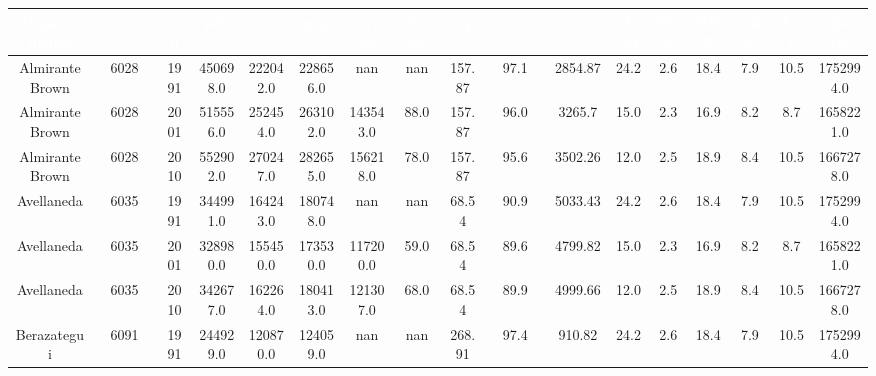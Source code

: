\begin{table}[htb]
\centering
\begin{tabular}{|c|c|c|c|c|c|c|c|c|c|c|c|c|c|c|c|c|}
\hline
\textbf{\cellcolor[rgb]{0,0.231,0.427}\textcolor{white}{Departamento}} & \textbf{\cellcolor[rgb]{0,0.231,0.427}\textcolor{white}{$cod_depto$}} & \textbf{\cellcolor[rgb]{0,0.231,0.427}\textcolor{white}{ano}} & \textbf{\cellcolor[rgb]{0,0.231,0.427}\textcolor{white}{pob}} & \textbf{\cellcolor[rgb]{0,0.231,0.427}\textcolor{white}{var}} & \textbf{\cellcolor[rgb]{0,0.231,0.427}\textcolor{white}{muj}} & \textbf{\cellcolor[rgb]{0,0.231,0.427}\textcolor{white}{vivpart}} & \textbf{\cellcolor[rgb]{0,0.231,0.427}\textcolor{white}{vivtotal}} & \textbf{\cellcolor[rgb]{0,0.231,0.427}\textcolor{white}{sup}} & \textbf{\cellcolor[rgb]{0,0.231,0.427}\textcolor{white}{$ind_masc$}} & \textbf{\cellcolor[rgb]{0,0.231,0.427}\textcolor{white}{$dens_pob$}} & \textbf{\cellcolor[rgb]{0,0.231,0.427}\textcolor{white}{TMI}} & \textbf{\cellcolor[rgb]{0,0.231,0.427}\textcolor{white}{TGF}} & \textbf{\cellcolor[rgb]{0,0.231,0.427}\textcolor{white}{TBN}} & \textbf{\cellcolor[rgb]{0,0.231,0.427}\textcolor{white}{TBM}} & \textbf{\cellcolor[rgb]{0,0.231,0.427}\textcolor{white}{TCV}} & \textbf{\cellcolor[rgb]{0,0.231,0.427}\textcolor{white}{Mat1ria}} \\ \hline
Almirante Brown & 6028 & 1991 & 450698.0 & 222042.0 & 228656.0 & nan & nan & 157.87 & 97.1 & 2854.87 & 24.2 & 2.6 & 18.4 & 7.9 & 10.5 & 1752994.0 \\
Almirante Brown & 6028 & 2001 & 515556.0 & 252454.0 & 263102.0 & 143543.0 & 88.0 & 157.87 & 96.0 & 3265.7 & 15.0 & 2.3 & 16.9 & 8.2 & 8.7 & 1658221.0 \\
Almirante Brown & 6028 & 2010 & 552902.0 & 270247.0 & 282655.0 & 156218.0 & 78.0 & 157.87 & 95.6 & 3502.26 & 12.0 & 2.5 & 18.9 & 8.4 & 10.5 & 1667278.0 \\
Avellaneda & 6035 & 1991 & 344991.0 & 164243.0 & 180748.0 & nan & nan & 68.54 & 90.9 & 5033.43 & 24.2 & 2.6 & 18.4 & 7.9 & 10.5 & 1752994.0 \\
Avellaneda & 6035 & 2001 & 328980.0 & 155450.0 & 173530.0 & 117200.0 & 59.0 & 68.54 & 89.6 & 4799.82 & 15.0 & 2.3 & 16.9 & 8.2 & 8.7 & 1658221.0 \\
Avellaneda & 6035 & 2010 & 342677.0 & 162264.0 & 180413.0 & 121307.0 & 68.0 & 68.54 & 89.9 & 4999.66 & 12.0 & 2.5 & 18.9 & 8.4 & 10.5 & 1667278.0 \\
Berazategui & 6091 & 1991 & 244929.0 & 120870.0 & 124059.0 & nan & nan & 268.91 & 97.4 & 910.82 & 24.2 & 2.6 & 18.4 & 7.9 & 10.5 & 1752994.0 \\

\end{tabular}
\end{table}
